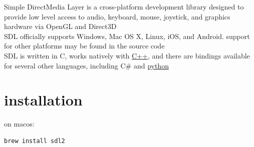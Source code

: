 \documentclass[a4paper,12pt]{article}
\begin{document}
\newenvironment{note}
  {\begin{bclogo}[logo=\bcinfo, couleurBarre=orange, couleur=lightgray]{ note}}
  {\end{bclogo}}
\newenvironment{attention}
  {\begin{bclogo}[logo=\bcattention, couleurBarre=red, noborder=true, 
                couleur=red!15]{Important!}}
  {\end{bclogo}}

Simple DirectMedia Layer is a cross-platform development library designed to provide low level access to audio, keyboard, mouse, joystick, and graphics hardware via OpenGL and Direct3D\\
SDL officially supports Windows, Mac OS X, Linux, iOS, and Android. support for other platforms may be found in the source code\\
SDL is written in C, works natively with \href{cpp.org}{C++}, and there are bindings available for several other languages, including C\# and \href{20220809215936-python.org}{python} \cite{sdl}\\

\section{installation}
\label{sec:orgc7e384d}
on macos:\\
\lstset{language=bash,label= ,caption= ,captionpos=b,numbers=none}
\begin{lstlisting}
brew install sdl2
\end{lstlisting}
\end{document}
